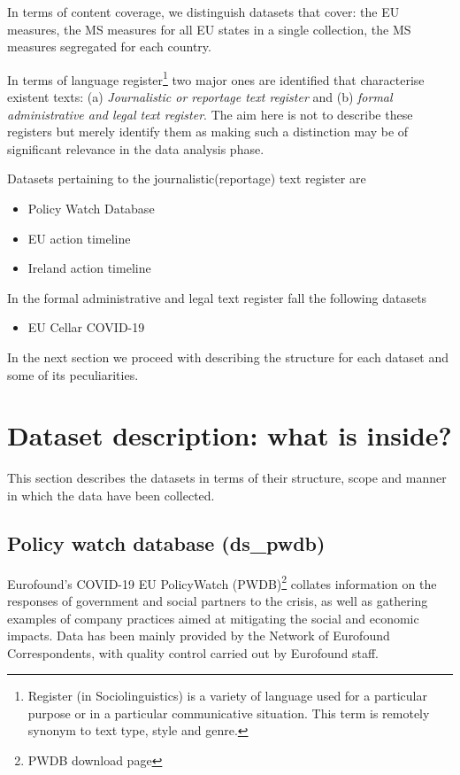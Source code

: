 In terms of content coverage, we distinguish datasets that cover: the EU measures, the MS measures for all EU states in a single collection, the MS measures segregated for each country. 

In terms of language register\footnote{Register (in Sociolinguistics) is a variety of language used for a particular purpose or in a particular communicative situation. This term is remotely synonym to text type, style and genre.} two major ones are identified that characterise existent texts: (a) \textit{Journalistic or reportage text register} and (b) \textit{formal administrative and legal text register}. The aim here is not to describe these registers but merely identify them as making such a distinction may be of significant relevance in the data analysis phase. 

Datasets pertaining to the journalistic(reportage) text register are

\begin{itemize}
	\item Policy Watch Database 
	\item EU action timeline

	\item Ireland action timeline
\end{itemize}

In the formal administrative and legal text register fall the following datasets

\begin{itemize}
	\item EU Cellar COVID-19 
\end{itemize}

In the next section we proceed with describing the structure for each dataset and some of its peculiarities.

\section{Dataset description: what is inside? }

This section describes the datasets in terms of their structure, scope and manner in which the data have been collected. 

\subsection{Policy watch database (ds\_pwdb)}

Eurofound's COVID-19 EU PolicyWatch (PWDB)\footnote{ PWDB download page  } collates information on the responses of government and social partners to the crisis, as well as gathering examples of company practices aimed at mitigating the social and economic impacts. Data has been mainly provided by the Network of Eurofound Correspondents, with quality control carried out by Eurofound staff.

